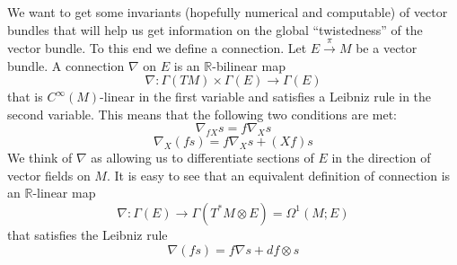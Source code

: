 We want to get some invariants (hopefully numerical and computable) of vector bundles that will help us get information on the global ``twistedness'' of the vector bundle. To this end we define a connection. Let $E \stackrel{\pi}{\rightarrow} M$ be a vector bundle. A connection $\nabla$ on $E$ is an $\mathbb R$-bilinear map
\[ \nabla : \Gamma(TM) \times \Gamma(E) \rightarrow \Gamma(E) \]
that is $C^\infty(M)$-linear in the first variable and satisfies a Leibniz rule in the second variable. This means that the following two conditions are met:
\begin{equation}
\nabla_{f X} s = f \nabla_X s
\end{equation}
\begin{equation}
\nabla_X (fs) = f \nabla_X s + (X f)s 
\end{equation}
We think of $\nabla$ as allowing us to differentiate sections of $E$ in the direction of vector fields on $M$. It is easy to see that an equivalent definition of connection is an $\mathbb R$-linear map
\[ \nabla : \Gamma(E) \rightarrow \Gamma(T^* M \otimes E) = \Omega^1(M;E) \]
that satisfies the Leibniz rule
\[ \nabla(fs) = f \nabla s + df \otimes s \]


